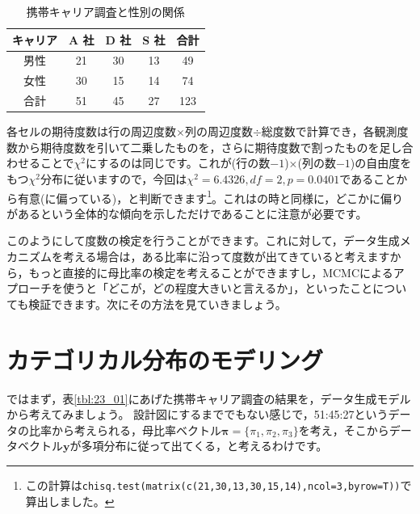 \documentclass{ltjsbook}
\begin{document}
\begin{table}[ht]
    \centering
    \caption{携帯キャリア調査と性別の関係}
    \begin{tabular}{c|ccc|c}
        キャリア & A 社 & D 社 & S 社 & 合計\\\hline
        男性 & 21 & 30 & 13 & 49 \\
        女性 & 30 & 15 & 14 & 74 \\\hline
        合計 & 51 & 45 & 27 & 123 \\
    \end{tabular}
    \label{tbl:23_02}
\end{table}

各セルの期待度数は行の周辺度数$\times$列の周辺度数$\div$総度数で計算でき，各観測度数から期待度数を引いて二乗したものを，さらに期待度数で割ったものを足し合わせることで$\chi^2$にするのは同じです。これが(行の数$-1$)$\times$(列の数$-1$)の自由度をもつ$\chi^2$分布に従いますので，今回は$\chi^2=6.4326,df=2,p=0.0401$であることから有意(に偏っている)，と判断できます\footnote{この計算は\verb|chisq.test(matrix(c(21,30,13,30,15,14),ncol=3,byrow=T))|で算出しました。}。これはの時と同様に，どこかに偏りがあるという全体的な傾向を示しただけであることに注意が必要です。

このようにして度数の検定を行うことができます。これに対して，データ生成メカニズムを考える場合は，ある比率に沿って度数が出てきていると考えますから，もっと直接的に母比率の検定を考えることができますし，MCMCによるアプローチを使うと「どこが，どの程度大きいと言えるか」，といったことについても検証できます。次にその方法を見ていきましょう。

\section{カテゴリカル分布のモデリング}
ではまず，表\ref{tbl:23_01}にあげた携帯キャリア調査の結果を，データ生成モデルから考えてみましょう。
設計図にするまででもない感じで，51:45:27というデータの比率から考えられる，母比率ベクトル$\bm{\pi} = \{ \pi_1,\pi_2,\pi_3 \}$を考え，そこからデータベクトル$\bm{y}$が多項分布に従って出てくる，と考えるわけです。
\end{document}
